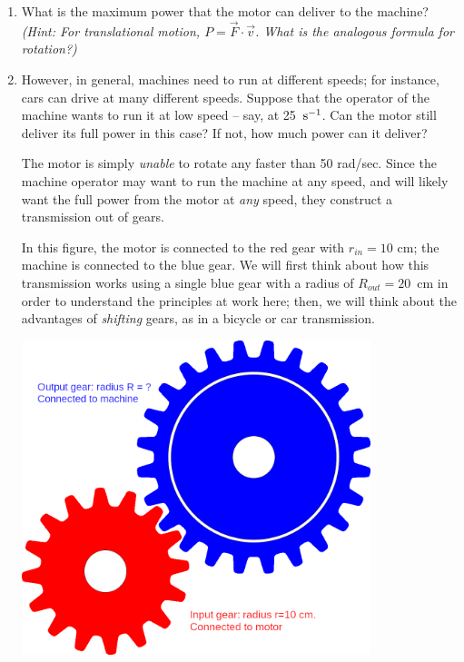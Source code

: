 \documentclass[12pt]{article}
\begin{document}
\begin{enumerate}

\item What is the maximum power that the motor can deliver to the machine? \textit{(Hint: For translational motion, $P = \vec F \cdot \vec v$. What is the analogous formula for rotation?)}
	
	
	\vspace{1in}
	
\item However, in general, machines need to run at different speeds; for instance, cars can drive at many different speeds. Suppose that the operator of the machine wants to run it at low speed -- say, at 25~$\rm s^{-1}$. Can the motor still deliver its full power in this case? If not, how much power can it deliver?
	
\vspace{1.5in}
\newpage



 The motor is simply {\it unable} to rotate any faster than 50 rad/sec. Since the machine operator may want to run the machine at any speed, and will likely want the full power from the motor at {\it any} speed, they construct a transmission out of gears.
\medskip

\begin{minipage}{0.4\textwidth}
	
	In this figure, the motor is connected to the red gear with $r_{in}=10$ cm; the machine is connected to the blue gear. We will first think about how this transmission works using
	a single blue gear with a radius of $R_{out}=20$~cm in order to understand the principles at work here; then, we will think about the advantages of {\it shifting} gears,
	as in a bicycle or car transmission.
	
\end{minipage}
\begin{minipage}{0.49\textwidth}
	\begin{center}
		\includegraphics[width=0.8\textwidth]{Gears.png}
	\end{center}
\end{minipage}
\medskip


\end{enumerate}
\end{document}
